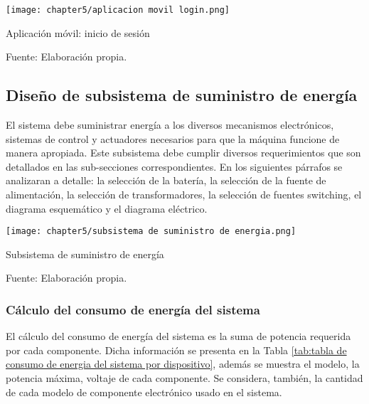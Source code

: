 \begin{myfigure}[H]
	\footnotesize\centering
	\texttt{[image: chapter5/aplicacion movil login.png]}
	\caption{Aplicación móvil: inicio de sesión}
	\begin{myflushcenter}
		Fuente: Elaboración propia.
	\end{myflushcenter}
	\label{fig:aplicacion movil login}
\end{myfigure}

\subsection{Diseño de subsistema de suministro de energía}
\label{ssec:diseno de subsistema de suministro de energia}

El sistema debe suministrar energía a los diversos mecanismos electrónicos, sistemas de control y actuadores necesarios para que la máquina funcione de manera apropiada. Este subsistema debe cumplir diversos requerimientos que son detallados en las sub-secciones correspondientes. En los siguientes párrafos se analizaran a detalle: la selección de la batería, la selección de la fuente de alimentación, la selección de transformadores, la selección de fuentes switching, el diagrama esquemático y el diagrama eléctrico.

\begin{myfigure}[H]
	\footnotesize\centering
	\texttt{[image: chapter5/subsistema de suministro de energia.png]}
	\caption{Subsistema de suministro de energía}
	\begin{myflushcenter}
		Fuente: Elaboración propia.
	\end{myflushcenter}
	\label{fig:subsistema de suministro de energia}
\end{myfigure}


\subsubsection{Cálculo del consumo de energía del sistema} 

El cálculo del consumo de energía del sistema es la suma de potencia requerida por cada componente. Dicha información se presenta en la Tabla \ref{tab:tabla de consumo de energia del sistema por dispositivo}, además se muestra el modelo, la potencia máxima, voltaje de cada componente. Se considera, también, la cantidad de cada modelo de componente electrónico usado en el sistema.


